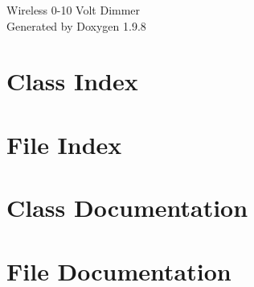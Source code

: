 \documentclass[twoside]{book}
\newcommand{\+}{\discretionary{\mbox{\scriptsize$\hookleftarrow$}}{}{}}
\newcommand{\clearemptydoublepage}{%
    \newpage{\pagestyle{empty}\cleardoublepage}%
  }
\begin{document}
  \raggedbottom
    \hypersetup{pageanchor=false,
                bookmarksnumbered=true,
                pdfencoding=unicode
               }
  \begin{titlepage}
  \vspace*{7cm}
  \begin{center}%
  {\Large Wireless 0-\/10 Volt Dimmer}\\
  \vspace*{1cm}
  {\large Generated by Doxygen 1.9.8}\\
  \end{center}
  \end{titlepage}
  \clearemptydoublepage
  \tableofcontents
  \clearemptydoublepage
  \hypersetup{pageanchor=true}

\chapter{Class Index}

\chapter{File Index}

\chapter{Class Documentation}








\chapter{File Documentation}



















  \backmatter
  \newpage
  \clearemptydoublepage
  \printindex
\end{document}
